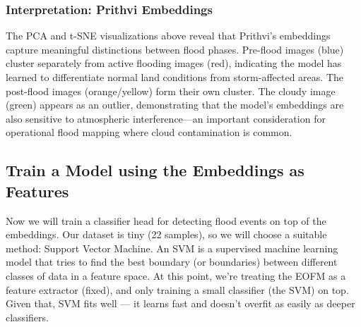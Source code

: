 \documentclass[
  letterpaper,
  DIV=11,
  numbers=noendperiod]{scrreprt}
\begin{document}
\subsubsection{Interpretation: Prithvi
Embeddings}\label{interpretation-prithvi-embeddings}

The PCA and t-SNE visualizations above reveal that Prithvi's embeddings
capture meaningful distinctions between flood phases. Pre-flood images
(blue) cluster separately from active flooding images (red), indicating
the model has learned to differentiate normal land conditions from
storm-affected areas. The post-flood images (orange/yellow) form their
own cluster. The cloudy image (green) appears as an outlier,
demonstrating that the model's embeddings are also sensitive to
atmospheric interference---an important consideration for operational
flood mapping where cloud contamination is common.

\subsection{Train a Model using the Embeddings as
Features}\label{train-a-model-using-the-embeddings-as-features}

Now we will train a classifier head for detecting flood events on top of
the embeddings. Our dataset is tiny (22 samples), so we will choose a
suitable method: Support Vector Machine. An SVM is a supervised machine
learning model that tries to find the best boundary (or boundaries)
between different classes of data in a feature space. At this point,
we're treating the EOFM as a feature extractor (fixed), and only
training a small classifier (the SVM) on top. Given that, SVM fits well
--- it learns fast and doesn't overfit as easily as deeper classifiers.
\end{document}
